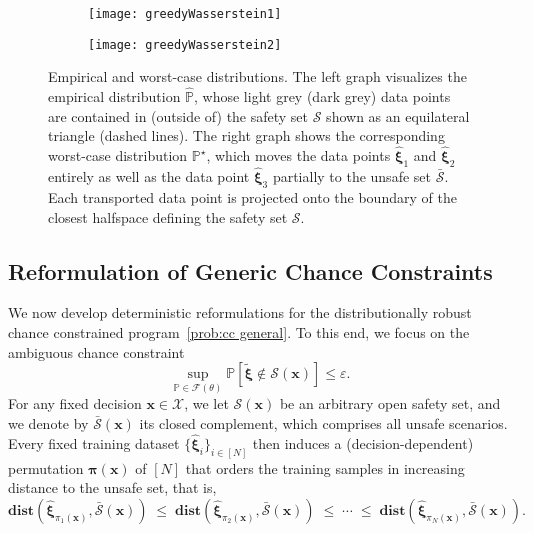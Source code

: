 \documentclass[nonblindrev]{informs2017}
\newcommand{\bmt}[1]{\tilde{\bm{#1}}}
\newcommand{\bmh}[1]{\hat{\bm{#1}}}
\newcommand{\1}[1]{\mathds{1}{\left(#1\right)}}
\begin{document}
\begin{figure}[tb]
\begin{subfigure}{.5\textwidth}
\begin{center}
\texttt{[image: greedyWasserstein1]}
\end{center}
\end{subfigure}%
\begin{subfigure}{.5\textwidth}
\begin{center}
\texttt{[image: greedyWasserstein2]}
\end{center}
\end{subfigure}
\vspace{0.2cm}
	
\caption{{\textnormal{Empirical and worst-case distributions. The left graph visualizes the empirical distribution $\hat{\mathbb{P}}$, whose light grey (dark grey) data points are contained in (outside of) the safety set $\mathcal{S}$ shown as an equilateral triangle (dashed lines). The right graph shows the corresponding worst-case distribution $\mathbb{P}^\star$, which moves the data points $\bmh{\xi}_1$ and $\bmh{\xi}_2$ entirely as well as the data point $\bmh{\xi}_3$ partially to the unsafe set $\bar{\mathcal{S}}$. Each transported data point is projected onto the boundary of the closest halfspace defining the safety set $\mathcal{S}$.}} \label{fig:greedy}}
\end{figure}

\subsection{Reformulation of Generic Chance Constraints}\label{sec:ref_generic}

We now develop deterministic reformulations for the distributionally robust chance constrained program~\eqref{prob:cc general}. To this end, we focus on the ambiguous chance constraint
\begin{equation}
\label{prob:worst-case cc}
\sup_{\mathbb{P} \in \mathcal{F}(\theta)} \mathbb{P}[\bmt{\xi} \notin \mathcal{S}(\bm{x})] \leq \varepsilon.
\end{equation}
For any fixed decision $\bm x\in \mathcal{X}$, we let $\mathcal{S}(\bm{x})$ be an arbitrary open safety set, and we denote by $\bar{\mathcal{S}}(\bm{x})$ its closed complement, which comprises all unsafe scenarios. 
Every fixed training dataset $\{\bmh{\xi}_i\}_{i \in [N]}$ then induces a (decision-dependent) permutation $\bm{\pi}(\bm{x})$ of $[N]$ that orders the training samples in increasing distance to the unsafe set, that is, 
\begin{equation*}
\mathbf{dist}(\bmh{\xi}_{\pi_1(\bm{x})}, \bar{\mathcal{S}}(\bm{x})) \; \leq \; \mathbf{dist}(\bmh{\xi}_{\pi_2(\bm{x})}, \bar{\mathcal{S}}(\bm{x})) 
\; \leq \; \cdots \; \leq \; \mathbf{dist}(\bmh{\xi}_{\pi_N(\bm{x})}, \bar{\mathcal{S}}(\bm{x})).
\end{equation*}
\end{document}
